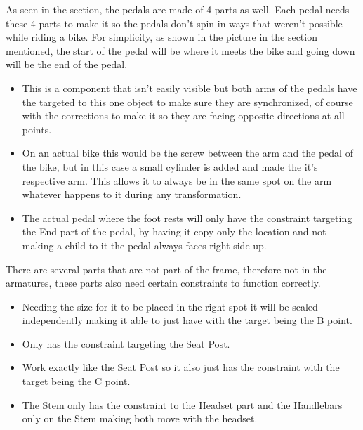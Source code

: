 \documentclass[letterpaper,10pt,english]{jupyterBook}
\begin{document}
\sphinxAtStartPar
As seen in the {\hyperref[\detokenize{Making the Model::doc}]{}} section, the pedals are made of 4 parts as well. Each pedal needs these 4 parts to make it so the pedals don’t spin in ways that weren’t possible while riding a bike. For simplicity, as shown in the picture in the section mentioned, the start of the pedal will be where it meets the bike and going down will be the end of the pedal.
\begin{itemize}
\item {} 
\sphinxAtStartPar
{} This is a component that isn’t easily visible but both arms of the pedals have the  targeted to this one object to make sure they are synchronized, of course with the corrections to make it so they are facing opposite directions at all points.

\item {} 
\sphinxAtStartPar
{} On an actual bike this would be the screw between the arm and the pedal of the bike, but in this case a small cylinder is added and made the  it’s respective arm. This allows it to always be in the same spot on the arm whatever happens to it during any transformation.

\item {} 
\sphinxAtStartPar
{} The actual pedal where the foot rests will only have the  constraint targeting the End part of the pedal, by having it copy only the location and not making a child to it the pedal always faces right side up.

\end{itemize}

\sphinxAtStartPar
{} There are several parts that are not part of the frame, therefore not in the armatures, these parts also need certain constraints to function correctly.
\begin{itemize}
\item {} 
\sphinxAtStartPar
{} Needing the size for it to be placed in the right spot it will be scaled independently making it able to just have  with the target being the B point.

\item {} 
\sphinxAtStartPar
{} Only has the  constraint targeting the Seat Post.

\item {} 
\sphinxAtStartPar
{} Work exactly like the Seat Post so it also just has the  constraint with the target being the C point.

\item {} 
\sphinxAtStartPar
{} The Stem only has the  constraint to the Headset part and the Handlebars only  on the Stem making both move with the headset.

\end{itemize}
\end{document}
